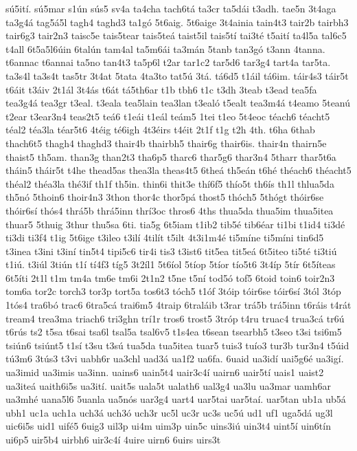 {sú5ití.
sú5mar
s1ún
sús5
sv4a
ta4cha
tach6tá
ta3cr
ta5dái
t3adh.
tae5n
3t4aga
ta3g4á
tag5á5l
tagh4
taghd3
ta1gó
5t6aig.
5t6aige
3t4ainia
tain4t3
tair2b
tairbh3
tair6g3
tair2n3
taisc5e
tais5tear
tais5teá
taist5il
tais5tí
tai3té
t5aití
ta4l5a
tal6c5
t4all
6t5a5l6úin
6talún
tam4al
ta5m6ái
ta3mán
5tanb
tan3gó
t3ann
4tanna.
t6annac
t6annai
ta5no
tan4t3
ta5p6l
t2ar
tar1c2
tar5d6
tar3g4
tart4a
tar5ta.
ta3s4l
ta3s4t
tas5tr
3t4at
5tata
4ta3to
tat5ú
3tá.
tá6d5
t1áil
tá6im.
táir4s3
táir5t
t6áit
t3áiv
2t1ál
3t4ás
t6át
tá5th6ar
t1b
tbh6
t1c
t3dh
3teab
t3ead
tea5fa
tea3g4á
tea3gr
t3eal.
t3eala
tea5lain
tea3lan
t3ealó
t5ealt
tea3m4á
t4eamo
5teanú
t2ear
t3ear3n4
teas2t5
teá6
t1eái
t1eál
teám5
1tei
t1eo
5t4eoc
téach6
téacht5
téal2
téa3la
téar5t6
4téig
té6igh
4t3éirs
t4éit
2t1f
t1g
t2h
4th.
t6ha
6thab
thach6t5
thagh4
thaghd3
thair4b
thairbh5
thair6g
thair6is.
thair4n
thairn5e
thaist5
th5am.
than3g
than2t3
tha6p5
tharc6
thar5g6
thar3n4
5tharr
thar5t6a
tháin5
tháir5t
t4he
thead5as
thea3la
theas4t5
6theá
th5eán
t6hé
théach6
théacht5
théal2
théa3la
thé3if
th1f
th5in.
thin6i
thit3e
thí6f5
thío5t
th6ís
th1l
thlua5da
th5nó
5thoin6
thoir4n3
3thon
thor4c
thor5pá
thost5
thóch5
5thógt
thóir6se
thóir6sí
thós4
thrá5b
thrá5inn
thrí3oc
thros6
4ths
thua5da
thua5im
thua5itea
thuar5
5thuig
3thur
thu5sa
6ti.
tia5g
6t5iam
t1ib2
tib5é
tib6éar
ti1bi
t1id4
ti3dé
ti3di
ti3f4
t1ig
5t6ige
t3ileo
t3ilí
4tilít
t5ilt
4t3i1m4é
ti5míne
ti5míni
tin6d5
t3inea
t3ini
t3iní
tin5t4
tipi5c6
tir4i
tis3
t3ist6
tit5ea
tit5eá
6t5iteo
ti5té
ti3tiú
t1iú.
t3iúl
3tiún
t1í
tí4f3
tíg5
3t2íl1
5t6íol
5tíop
5tíor
tío5t6
3t4íp
5tír
6t5íteas
6t5íti
2t1l
t1m
tm4a
tm6e
tm6i
2t1n2
t5ne
t5ní
tod5ó
tof5
6toid
toin6
toir2n3
tom6a
tor2c
torch3
tor3p
tort5a
tos6t3
tóch5
t1óf
3tóip
tóir6se
tóir6sí
3tól
3tóp
1tós4
tra6bó
trac6
6tra5cá
trai6m5
4traip
6traláib
t3rar
trá5b
trá5inn
t6ráis
t4rát
tream4
trea3ma
triach6
tri3ghn
trí1r
tros6
trost5
3tróp
t4ru
truac4
trua3cá
tr6ú
t6rús
ts2
t5sa
t6sai
tsa6l
tsal5a
tsal6v5
t1s4ea
t6sean
tsearbh5
t3seo
t3si
tsi6m5
tsiún6
tsiúnt5
t1sí
t3su
t3sú
tua5da
tua5itea
tuar5
tuis3
tuío3
tur3b
tur3n4
t5úid
tú3m6
3tús3
t3vi
uabh6r
ua3chl
uad3á
ua1f2
ua6fa.
6uaid
ua3idí
uai5g6é
ua3igí.
ua3imid
ua3imis
ua3inn.
uains6
uain5t4
uair3c4í
uairn6
uair5tí
uais1
uaist2
ua3iteá
uaith6i5s
ua3ití.
uait5s
uala5t
ualath6
ual3g4
ua3lu
ua3mar
uamh6ar
ua3mhé
uana5l6
5uanla
ua5nós
uar3g4
uart4
uar5tai
uar5taí.
uar5tan
ub1a
ub5á
ubh1
uc1a
uch1a
uch3á
uch3ó
uch3r
uc5l
uc3r
uc3s
uc5ú
ud1
uf1
uga5dá
ug3l
uic6i5s
uid1
uifé5
6uig3
uil3p
ui4m
uim3p
uin5c
uins3iú
uin3t4
uint5í
uin6tín
ui6p5
uir5b4
uirbh6
uir3c4í
4uire
uirn6
6uirs
uirs3t
}
